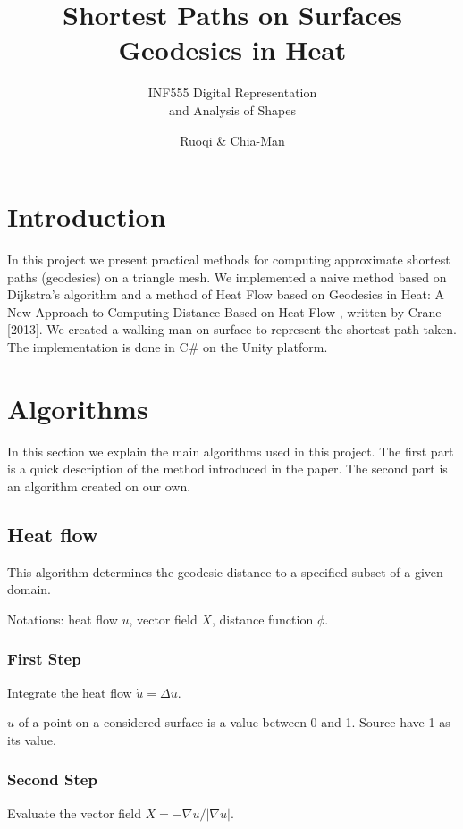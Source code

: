 \documentclass[a4paper,12pt,twoside]{article}
\title{Shortest Paths on Surfaces\\ Geodesics in Heat}
\subtitle{INF555 Digital Representation\\ and Analysis of Shapes }
\author{Ruoqi \bsc{He} \& Chia-Man \bsc{Hung}}
\begin{document}
\maketitle

\section{Introduction}

In this project we present practical methods for computing approximate shortest paths (geodesics) on a triangle mesh. We implemented a naive method based on Dijkstra's algorithm and a method of Heat Flow based on \og Geodesics in Heat: A New Approach to Computing Distance Based on Heat Flow \fg{}, written by Crane [2013]. We created a walking man on surface to represent the shortest path taken. The implementation is done in C\# on the Unity platform.

\section{Algorithms}

In this section we explain the main algorithms used in this project. The first part is a quick description of the method introduced in the paper. The second part is an algorithm created on our own.

\subsection{Heat flow}
This algorithm determines the geodesic distance to a specified subset of a given domain. 

Notations: heat flow $u$, vector field $X$, distance function $\phi$.

\subsubsection{First Step}
Integrate the heat flow $\dot{u} = \Delta u$.

$u$ of a point on a considered surface is a value between 0 and 1. Source have 1 as its value.

\subsubsection{Second Step}
Evaluate the vector field $X = -\nabla u / \left | \nabla u \right |$.
\end{document}
